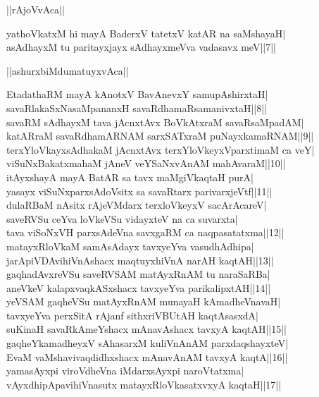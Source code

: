 \documentclass{article}
\begin{document}
\begin{center}
||rAjoVvAca||
\end{center}

yathoVkatxM hi mayA BaderxV tatetxV katAR na saMshayaH|\\
asAdhayxM tu paritayxjayx sAdhayxmeVva vadasavx meV||7||\\

\begin{center}
||ashurxbiMdumatuyxvAca||
\end{center}

EtadathaRM mayA kAnotxV BavAnevxY samupAshirxtaH|\\
savaRlakaSxNasaMpananxH savaRdhamaRsamanivxtaH||8||\\
savaRM sAdhayxM tava jAcnxtAvx BoVkAtxraM savaRsaMpadAM|\\
katARraM savaRdhamARNAM sarxSATxraM puNayxkamaRNAM||9||\\
terxYloVkayxsAdhakaM jAcnxtAvx terxYloVkeyxVparxtimaM ca veY|\\
viSuNxBakatxmahaM jAneV veYSaNxvAnAM mahAvaraM||10||\\
itAyxshayA mayA BatAR sa tavx maMgiVkaqtaH purA|\\
yasayx viSuNxparxsAdoVsitx sa savaRtarx parivarxjeVtf||11||\\
dulaRBaM nAsitx rAjeVMdarx terxloVkeyxV sacArAcareV|\\
saveRVSu ceYva loVkeVSu vidayxteV na ca suvarxta|\\
tava viSoNxVH parxsAdeVna savxgaRM ca naqpasatatxma||12||\\
matayxRloVkaM samAsAdayx tavxyeYva vasudhAdhipa|\\
jarApiVDAvihiVnAshacx maqtuyxhiVnA narAH kaqtAH||13||\\
gaqhadAvxreVSu saveRVSAM matAyxRnAM tu naraSaRBa|\\
aneVkeV kalapxvaqkASxshacx tavxyeYva parikalipxtAH||14||\\
yeVSAM gaqheVSu matAyxRnAM munayaH kAmadheVnavaH|\\
tavxyeYva perxSitA rAjanf sithxriVBUtAH kaqtAsasxdA|\\
suKinaH savaRkAmeYshacx mAnavAshacx tavxyA kaqtAH||15||\\
gaqheYkamadheyxV sAhasarxM kuliVnAnAM parxdaqshayxteV|\\
EvaM vaMshavivaqdidhxshacx mAnavAnAM tavxyA kaqtA||16||\\
yamasAyxpi viroVdheVna iMdarxsAyxpi naroVtatxma|\\
vAyxdhipApavihiVnasutx matayxRloVkasatxvxyA kaqtaH||17||\\
\end{document}
